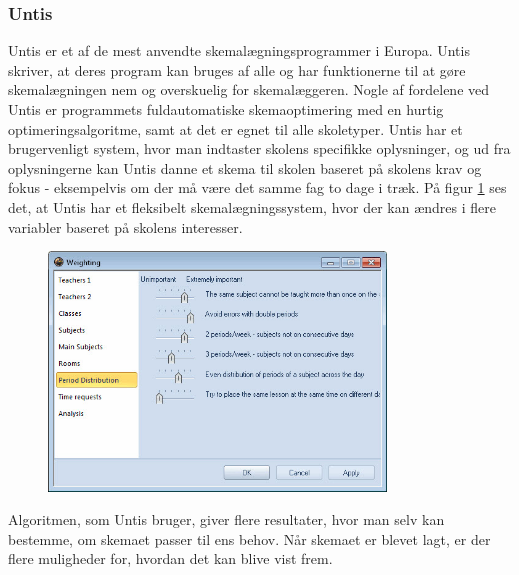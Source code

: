 \subsubsection{Untis}
Untis er et af de mest anvendte skemalægningsprogrammer i Europa. Untis skriver, at deres program kan bruges af alle og har funktionerne til at gøre skemalægningen nem og overskuelig for skemalæggeren. Nogle af fordelene ved Untis er programmets fuldautomatiske skemaoptimering med en hurtig optimeringsalgoritme, samt at det er egnet til alle skoletyper.\cite{UntisDK}
Untis har et brugervenligt system, hvor man indtaster skolens specifikke oplysninger, og ud fra oplysningerne kan Untis danne et skema til skolen baseret på skolens krav og fokus - eksempelvis om der må være det samme fag to dage i træk. På figur \ref{fig:untisskema} ses det, at Untis har et fleksibelt skemalægningssystem, hvor der kan ændres i flere variabler baseret på skolens interesser. 
\begin{figure}[h!]
	\centering
	\includegraphics[width=0.8\textwidth]{../Billeder/untisskema.jpg}
	\label{fig:untisskema}
\end{figure}
\FloatBarrier
Algoritmen, som Untis bruger, giver flere resultater, hvor man selv kan bestemme, om skemaet passer til ens behov. Når skemaet er blevet lagt, er der flere muligheder for, hvordan det kan blive vist frem.\cite{UntisInt}


